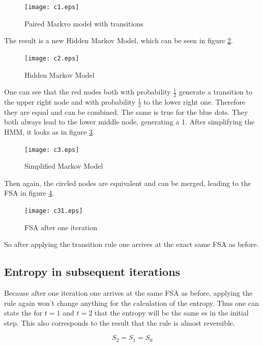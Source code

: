 \documentclass[12pt]{scrartcl}
\begin{document}
\begin{figure}
\centering
\texttt{[image: c1.eps]}
\caption{Paired Markvo model with transitions}
\label{fig:c1}
\end{figure}

The result is a new Hidden Markov Model, which can be seen in figure \ref{fig:c2}.

\begin{figure}
\centering
\texttt{[image: c2.eps]}
\caption{Hidden Markov Model}
\label{fig:c2}
\end{figure}

One can see that the red nodes both with probability $\frac{1}{2}$ generate a transition to the upper right node and with probability $\frac{1}{2}$ to the lower right one. Therefore they are equal and can be combined. The same is true for the blue dots. They both always lead to the lower middle node, generating a 1. After simplifying the HMM, it looks as in figure \ref{fig:c3}.

\begin{figure}[h!]
\centering
\texttt{[image: c3.eps]}
\caption{Simplified Markov Model}
\label{fig:c3}
\end{figure}

Then again, the circled nodes are equivalent and can be merged, leading to the FSA in figure \ref{fig:c31}.

\begin{figure}[h!]
\centering
\texttt{[image: c31.eps]}
\caption{FSA after one iteration}
\label{fig:c31}
\end{figure}

So after applying the transition rule one arrives at the exact same FSA as before.

\subsection*{Entropy in subsequent iterations}

Because after one iteration one arrives at the same FSA as before, applying the rule again won't change anything for the calculation of the entropy. Thus one can state the for $t=1$ and $t=2$ that the entropy will be the same es in the initial step. This also corresponds to the result that the rule is almost reversible.	

\begin{equation}
S_2 = S_1 = S_0
\end{equation}
\end{document}

